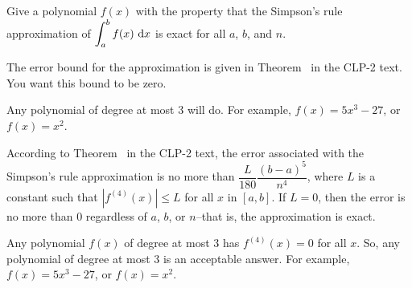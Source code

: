 \begin{question}
Give a polynomial $f(x)$ with the property that
 the Simpson's rule approximation of $\displaystyle\int_a^b f(x)~\mathrm{d}x$ is exact for all $a$, $b$, and $n$.
\end{question}
\begin{hint}
The error bound for the approximation is given in Theorem~ in the CLP-2 text. You want this bound to be zero.
\end{hint}
\begin{answer}
Any polynomial of degree at most 3 will do. For example, $f(x)=5x^3-27$, or $f(x)=x^2$.
\end{answer}
\begin{solution}
According to Theorem~  in the CLP-2 text, the error associated with the Simpson's rule approximation is no more than $\dfrac{L}{180}\dfrac{(b-a)^5}{n^4}$, where $L$ is a constant such that $|f^{(4)}(x)| \leq L$ for all $x$ in $[a,b]$. If $L=0$, then the error is no more than 0 regardless of $a$, $b$, or $n$--that is, the approximation is exact.

Any polynomial $f(x)$ of degree at most 3 has $f^{(4)}(x)=0$ for all $x$. So, any polynomial of degree at most 3 is an acceptable answer. For example, $f(x)=5x^3-27$, or $f(x)=x^2$.
\end{solution}



